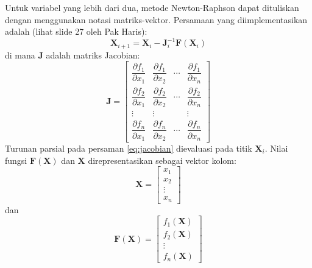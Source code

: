 Untuk variabel yang lebih dari dua, metode Newton-Raphson dapat dituliskan dengan
menggunakan notasi matriks-vektor.
Persamaan yang diimplementasikan adalah (lihat slide 27 oleh Pak Haris):
\begin{equation}
\mathbf{X}_{i+1} = \mathbf{X}_{i} - \mathbf{J}_{i}^{-1} \mathbf{F}(\mathbf{X}_{i})
\end{equation}
di mana $\mathbf{J}$ adalah matriks Jacobian:
\begin{equation}
\mathbf{J} = \begin{bmatrix}
\dfrac{\partial f_{1}}{\partial x_{1}} & \dfrac{\partial f_{1}}{\partial x_{2}} & \cdots &
\dfrac{\partial f_{1}}{\partial x_{n}} \\[0.4cm]
\dfrac{\partial f_{2}}{\partial x_{1}} & \dfrac{\partial f_{2}}{\partial x_{2}} & \cdots &
\dfrac{\partial f_{2}}{\partial x_{n}} \\[0.4cm]
\vdots & \vdots &  & \vdots \\[0.4cm]
\dfrac{\partial f_{n}}{\partial x_{1}} & \dfrac{\partial f_{n}}{\partial x_{2}} & \cdots &
\dfrac{\partial f_{n}}{\partial x_{n}}
\end{bmatrix}
\label{eq:jacobian}
\end{equation}
Turunan parsial pada persaman \eqref{eq:jacobian} dievaluasi pada titik $\mathbf{X}_{i}$.
Nilai fungsi $\mathbf{F}(\mathbf{X})$ dan $\mathbf{X}$ direpresentasikan sebagai vektor kolom:
\begin{equation}
\mathbf{X} = \begin{bmatrix}
x_{1} \\
x_{2} \\
\vdots \\
x_{n}
\end{bmatrix}
\end{equation}
dan
\begin{equation}
\mathbf{F}(\mathbf{X}) = \begin{bmatrix}
f_{1}(\mathbf{X}) \\
f_{2}(\mathbf{X}) \\
\vdots \\
f_{n}(\mathbf{X})
\end{bmatrix}
\end{equation}

